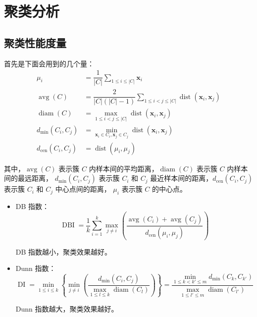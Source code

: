 \section{聚类分析}

\subsection{聚类性能度量}
首先是下面会用到的几个量：
\begin{equation}
    \begin{aligned}
        \mu_i &= \dfrac 1{|C|}\sum\limits_{1 \leq i \leq |C|} \boldsymbol{x}_i \\
        \operatorname{avg}(C) &= \dfrac{2}{|C|(|C|-1)} \sum\limits_{1 \leq i < j \leq |C|} \operatorname{dist}(\boldsymbol{x}_i, \boldsymbol{x}_j) \\
        \operatorname{diam}(C) &= \max_{1 \leq i < j \leq |C|} \operatorname{dist}(\boldsymbol{x}_i, \boldsymbol{x}_j) \\
        d_{\min}(C_i, C_j) &= \min_{\boldsymbol{x}_i \in C_i, \boldsymbol{x}_j \in C_j} \operatorname{dist}(\boldsymbol{x}_i, \boldsymbol{x}_j) \\
        d_{\text{cen}}(C_i, C_j) &= \operatorname{dist}(\mu_i, \mu_j)
        \end{aligned}
\end{equation}

其中，$\operatorname{avg}(C)$ 表示簇 $C$ 内样本间的平均距离，$\operatorname{diam}(C)$ 表示簇 $C$ 内样本间的最远距离，
$d_{\min}(C_i, C_j)$ 表示簇 $C_i$ 和 $C_j$ 最近样本间的距离，$d_{\text{cen}}(C_i, C_j)$ 表示簇 $C_i$ 和 $C_j$ 中心点间的距离，
$\mu_i$ 表示簇 $C$ 的中心点。

\begin{itemize}
    \item DB 指数：
    \begin{equation}
        \operatorname{DBI} = \dfrac 1k \sum\limits_{i=1}^k{\max_{j \neq i}\left(\dfrac{\operatorname{avg}(C_i)
         + \operatorname{avg}(C_j)}{d_{\text{cen}}(\mu_i, \mu_j)}\right)}
    \end{equation}\par
    DB 指数越小，聚类效果越好。
    \item Dunn 指数：
    \begin{equation}
        \operatorname{DI} = \min_{1 \leq i \leq k}\left\{\min_{j \neq i}\left(\dfrac{d_{\min}(C_i, C_j)}
        {\max\limits_{1 \leq l \leq k}\operatorname{diam}(C_l)}\right)\right\} 
        = \dfrac{\min_{1 \leq k < k' \leq m}d_{\min}(C_k, C_{k'})}{\max_{1 \leq l' \leq m}\operatorname{diam}(C_{l'})}
    \end{equation}\par
    Dunn 指数越大，聚类效果越好。
\end{itemize}

